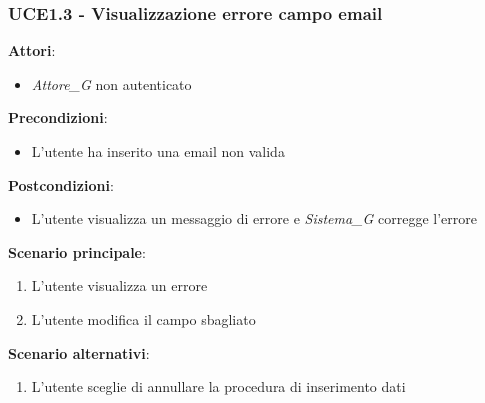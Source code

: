 \subsubsection{UCE1.3 - Visualizzazione errore campo email}
\textbf{Attori}:
\begin{itemize}
    \item \textit{Attore_G} non autenticato
\end{itemize}
\textbf{Precondizioni}:
\begin{itemize}
    \item L'utente ha inserito una email non valida
\end{itemize}
\textbf{Postcondizioni}:
\begin{itemize}
    \item L'utente visualizza un messaggio di errore e \textit{Sistema_G} corregge l'errore
\end{itemize}
\textbf{Scenario principale}:
\begin{enumerate}
    \item L'utente visualizza un errore 
    \item L'utente modifica il campo sbagliato
\end{enumerate}
\textbf{Scenario alternativi}:
\begin{enumerate}
    \item L'utente sceglie di annullare la procedura di inserimento dati
\end{enumerate}